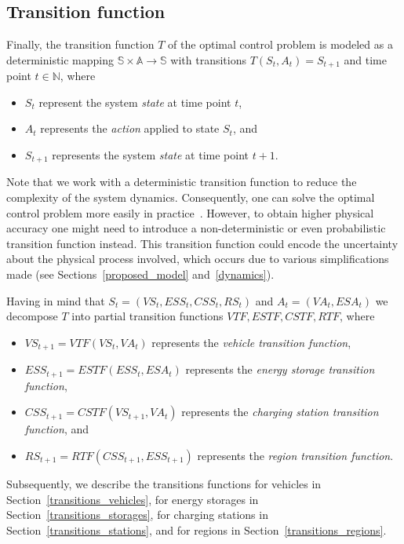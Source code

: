\subsection{Transition function}
\label{transitions}

Finally, the transition function $T$ of the optimal control problem is modeled as a deterministic mapping $\mathbb{S} \times \mathbb{A} \rightarrow \mathbb{S}$ with transitions $T(S_t, A_t) = S_{t+1}$ and time point $t \in \mathbb{N}$, where
\begin{itemize}
	\item $S_t$ represent the system \textit{state} at time point $t$,
	\item $A_t$ represents the \textit{action} applied to state $S_t$, and
	\item $S_{t+1}$ represents the system \textit{state} at time point $t+1$.
\end{itemize}
Note that we work with a deterministic transition function to reduce the complexity of the system dynamics. Consequently, one can solve the optimal control problem more easily in practice~\cite{Bertsekas1995}. However, to obtain higher physical accuracy one might need to introduce a non-deterministic or even probabilistic transition function instead. This transition function could encode the uncertainty about the physical process involved, which occurs due to various simplifications made (see Sections~\ref{proposed_model} and~\ref{dynamics}).

Having in mind that $S_t = (VS_t, ESS_t, CSS_t, RS_t)$ and $A_t = (VA_t, ESA_t)$ we decompose $T$ into partial transition functions $VTF,ESTF,CSTF,RTF$, where
\begin{itemize}
	\item $VS_{t+1} = VTF(VS_t, VA_t)$ represents the \textit{vehicle transition function},
	\item $ESS_{t+1} = ESTF(ESS_t, ESA_t)$ represents the \textit{energy storage transition function},
	\item $CSS_{t+1} = CSTF(VS_{t+1}, VA_t)$ represents the \textit{charging station transition function}, and
	\item $RS_{t+1} = RTF(CSS_{t+1}, ESS_{t+1})$ represents the \textit{region transition function}.
\end{itemize}
Subsequently, we describe the transitions functions for vehicles in Section~\ref{transitions_vehicles}, for energy storages in Section~\ref{transitions_storages}, for charging stations in Section~\ref{transitions_stations}, and for regions in Section~\ref{transitions_regions}.  

